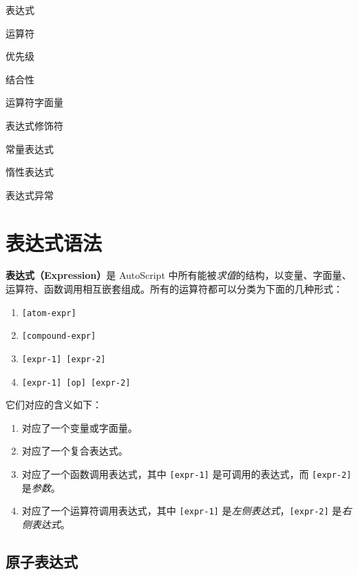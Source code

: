 \begin{introduction}
    \item 表达式
    \item 运算符
    \item 优先级
    \item 结合性
    \item 运算符字面量
    \item 表达式修饰符
    \item 常量表达式
    \item 惰性表达式
    \item 表达式异常
\end{introduction}

\section{表达式语法}

\textbf{表达式（Expression）}是 AutoScript 中所有能被\emph{求值}的结构，以变量、字面量、运算符、函数调用相互嵌套组成。所有的运算符都可以分类为下面的几种形式：

\begin{grammar}[表达式] \label{grm:expression}
\begin{enumerate}
	\item \texttt{[atom-expr]}
	\item \texttt{[compound-expr]}
	\item \texttt{[expr-1] [expr-2]}
	\item \texttt{[expr-1] [op] [expr-2]}
\end{enumerate}
\end{grammar}

它们对应的含义如下：

\begin{enumerate}
	\item 对应了一个变量或字面量。
	\item 对应了一个复合表达式。
	\item 对应了一个函数调用表达式，其中 \texttt{[expr-1]} 是可调用的表达式，而 \texttt{[expr-2]} 是\emph{参数}。
	\item 对应了一个运算符调用表达式，其中 \texttt{[expr-1]} 是\emph{左侧表达式}，\texttt{[expr-2]} 是\emph{右侧表达式}。
\end{enumerate}

\subsection{原子表达式}

